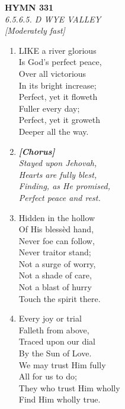 \newpage
\begin{center}
    {\Large \textbf{HYMN 331}}
    \\
    \textit{6.5.6.5. D WYE VALLEY}
    \\
    \textit{\small [Moderately fast]}
\end{center}
\vspace{1em}

\begin{enumerate}
    \item LIKE a river glorious \\
        Is God's perfect peace, \\
        Over all victorious \\
        In its bright increase; \\
        Perfect, yet it floweth \\
        Fuller every day; \\
        Perfect, yet it groweth \\
        Deeper all the way.

    \item[] \vspace{0.4em}
    \textbf{\textit{[Chorus]}} \\
    \textit{Stayed upon Jehovah,} \\
    \textit{Hearts are fully blest,} \\
    \textit{Finding, as He promised,} \\
    \textit{Perfect peace and rest.}
    \vspace{0.4em}

    \item Hidden in the hollow \\
        Of His bless\`ed hand, \\
        Never foe can follow, \\
        Never traitor stand; \\
        Not a surge of worry, \\
        Not a shade of care, \\
        Not a blast of hurry \\
        Touch the spirit there.

    \item Every joy or trial \\
        Falleth from above, \\
        Traced upon our dial \\
        By the Sun of Love. \\
        We may trust Him fully \\
        All for us to do; \\
        They who trust Him wholly \\
        Find Him wholly true.

\end{enumerate}

